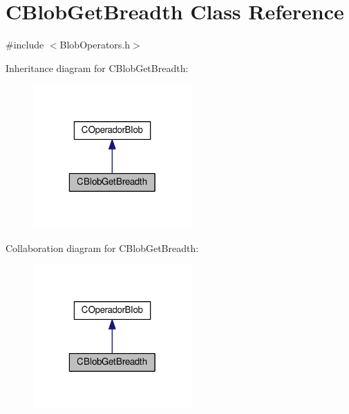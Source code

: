 \hypertarget{classCBlobGetBreadth}{\section{C\-Blob\-Get\-Breadth Class Reference}
\label{classCBlobGetBreadth}
}


{\ttfamily \#include $<$Blob\-Operators.\-h$>$}



Inheritance diagram for C\-Blob\-Get\-Breadth\-:\nopagebreak
\begin{figure}[H]
\begin{center}
\leavevmode
\includegraphics[width=172pt]{classCBlobGetBreadth__inherit__graph}
\end{center}
\end{figure}


Collaboration diagram for C\-Blob\-Get\-Breadth\-:\nopagebreak
\begin{figure}[H]
\begin{center}
\leavevmode
\includegraphics[width=172pt]{classCBlobGetBreadth__coll__graph}
\end{center}
\end{figure}
